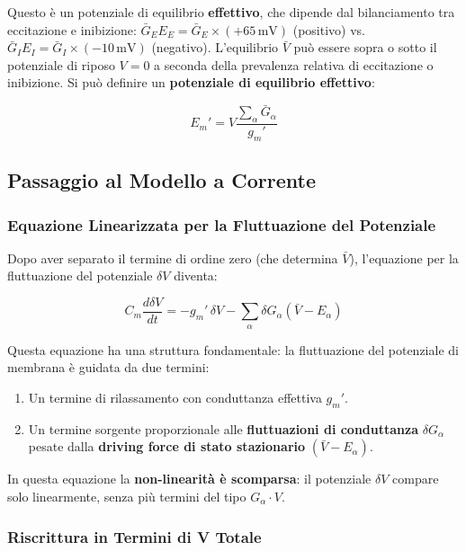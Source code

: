 Questo è un potenziale di equilibrio \textbf{effettivo}, che dipende dal bilanciamento tra eccitazione e inibizione: $\bar{G}_E E_E = \bar{G}_E \times (+65\,\text{mV})$ (positivo) vs. $\bar{G}_I E_I = \bar{G}_I \times (-10\,\text{mV})$ (negativo). L'equilibrio $\bar{V}$ può essere sopra o sotto il potenziale di riposo $V = 0$ a seconda della prevalenza relativa di eccitazione o inibizione. Si può definire un \textbf{potenziale di equilibrio effettivo}:

\begin{equation}
\boxed{E_m' = V \frac{\sum_\alpha \bar{G}_\alpha }{g_m'}}
\end{equation}


\subsection{Passaggio al Modello a Corrente}

\subsubsection{Equazione Linearizzata per la Fluttuazione del Potenziale}

Dopo aver separato il termine di ordine zero (che determina $\bar{V}$), l'equazione per la fluttuazione del potenziale $\delta V$ diventa:

\begin{equation}
C_m \frac{d\delta V}{dt} = -g_m' \,\delta V - \sum_\alpha \delta G_\alpha (\bar{V} - E_\alpha)
\end{equation}

Questa equazione ha una struttura fondamentale: la fluttuazione del potenziale di membrana è guidata da due termini:
\begin{enumerate}
    \item Un termine di rilassamento con conduttanza effettiva $g_m'$.
    \item Un termine sorgente proporzionale alle \textbf{fluttuazioni di conduttanza} $\delta G_\alpha$ pesate dalla \textbf{driving force di stato stazionario} $(\bar{V} - E_\alpha)$.
\end{enumerate}

In questa equazione la \textbf{non-linearità è scomparsa}: il potenziale $\delta V$ compare solo linearmente, senza più termini del tipo $G_\alpha \cdot V$.

\subsubsection{Riscrittura in Termini di V Totale}

